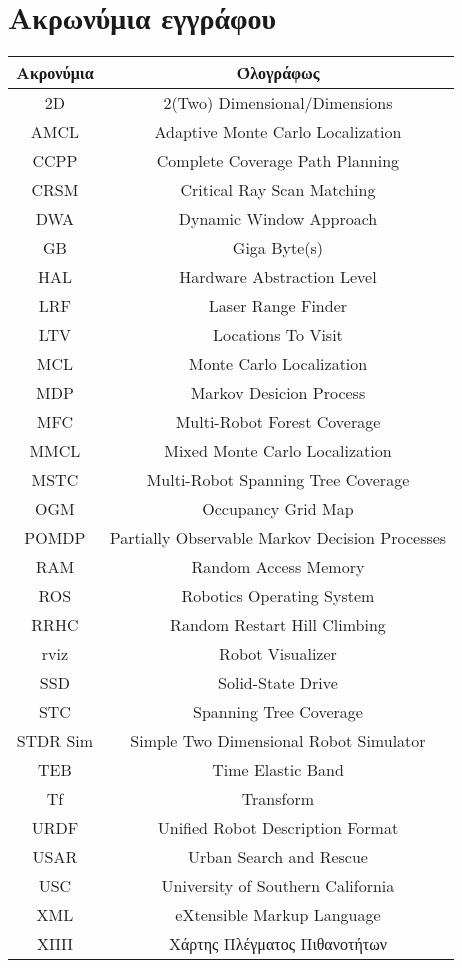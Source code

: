 \section*{Ακρωνύμια εγγράφου}

\begin{tabular}{c | c }
	\bfseries{Ακρονύμια} &\bfseries{Όλογράφως}\\ \hline
	2D 	 & 2(Two) Dimensional/Dimensions \\ \hline
	AMCL & Adaptive Monte Carlo Localization  \\ \hline
	CCPP & Complete Coverage Path Planning \\ \hline
	CRSM & Critical Ray Scan Matching \\ \hline
	DWA	 &  Dynamic Window Approach \\ \hline
	GB &  Giga Byte(s) \\ \hline
	HAL & Hardware Abstraction Level   \\ \hline
	LRF & Laser Range Finder \\ \hline
	LTV & Locations To Visit \\ \hline
	MCL & Monte Carlo Localization \\ \hline
	MDP & Markov Desicion Process \\ \hline
	MFC	& Multi-Robot Forest Coverage \\ \hline	
	MMCL & Mixed Monte Carlo Localization \\ \hline
	MSTC & Multi-Robot Spanning Tree Coverage \\ \hline
	OGM & Occupancy Grid Map \\ \hline
	POMDP & Partially Observable Markov Decision Processes \\ \hline
	RAM & Random Access Memory \\ \hline
	ROS & Robotics Operating System \\ \hline
	RRHC & Random Restart Hill Climbing \\ \hline
	rviz & 	Robot Visualizer \\ \hline
	SSD & Solid-State Drive \\ \hline
	STC & 	Spanning Tree Coverage \\ \hline
	STDR Sim & 	Simple Two Dimensional Robot Simulator \\ \hline
	TEB & Time Elastic Band \\ \hline
	Tf & Transform \\ \hline
	URDF & Unified Robot Description Format \\ \hline
	USAR & Urban Search and Rescue \\ \hline
	USC	& University of Southern California \\ \hline
	XML & eXtensible Markup Language \\ \hline 
	ΧΠΠ & Χάρτης Πλέγματος Πιθανοτήτων \\ \hline
\end{tabular}



